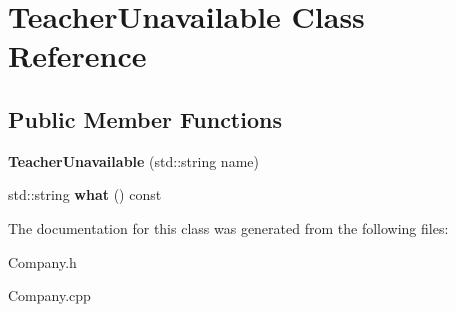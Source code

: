 \hypertarget{class_teacher_unavailable}{}\section{Teacher\+Unavailable Class Reference}
\label{class_teacher_unavailable}
\subsection*{Public Member Functions}
\begin{DoxyCompactItemize}
\item 
\mbox{\label{class_teacher_unavailable_a440954ee557d0c5838bff103b2e44538}} 
{\bfseries Teacher\+Unavailable} (std\+::string name)
\item 
\mbox{\label{class_teacher_unavailable_a532c66951ec9cb717e03f8dee7ae8199}} 
std\+::string {\bfseries what} () const
\end{DoxyCompactItemize}


The documentation for this class was generated from the following files\+:\begin{DoxyCompactItemize}
\item 
Company.\+h\item 
Company.\+cpp\end{DoxyCompactItemize}

